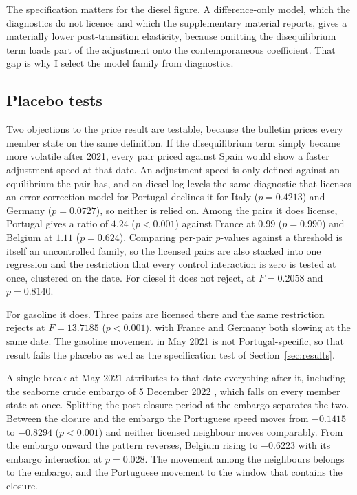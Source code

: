 \documentclass[11pt,a4paper]{article}
\begin{document}
The specification matters for the diesel figure. A difference-only model, which the diagnostics
do not licence and which the supplementary material reports, gives a materially lower post-transition
elasticity, because omitting the disequilibrium term loads part of the adjustment
onto the contemporaneous coefficient. That gap is why I select the model family from
diagnostics.

\subsection{Placebo tests}

Two objections to the price result are testable, because the bulletin prices every member state
on the same definition. If the disequilibrium term simply became more volatile after 2021, every
pair priced against Spain would show a faster adjustment speed at that date. An adjustment
speed is only defined against an equilibrium the pair has, and on diesel log levels the same
diagnostic that licenses an error-correction model for Portugal declines it for Italy
($p=0.4213$) and Germany ($p=0.0727$), so neither is relied on. Among the pairs it does license,
Portugal gives a ratio of $4.24$ ($p<0.001$) against France at $0.99$ ($p=0.990$) and Belgium at
$1.11$ ($p=0.624$). Comparing per-pair $p$-values against a threshold is itself an uncontrolled
family, so the licensed pairs are also stacked into one regression and the restriction that
every control interaction is zero is tested at once, clustered on the date. For diesel it does
not reject, at $F=0.2058$ and $p=0.8140$.

For gasoline it does. Three pairs are licensed there and the same restriction rejects at
$F=13.7185$ ($p<0.001$), with France and Germany both slowing at the same date. The gasoline
movement in May 2021 is not Portugal-specific, so that result fails the placebo as well as the
specification test of Section~\ref{sec:results}.

A single break at May 2021 attributes to that date everything after it, including the seaborne
crude embargo of 5 December 2022 \citep{eu2022embargo}, which falls on every member state at
once. Splitting the post-closure period at the embargo separates the two. Between the closure
and the embargo the Portuguese speed moves from $-0.1415$ to $-0.8294$ ($p<0.001$) and neither
licensed neighbour moves comparably. From the embargo onward the pattern reverses, Belgium
rising to $-0.6223$ with its embargo interaction at $p=0.028$. The movement among the
neighbours belongs to the embargo, and the Portuguese movement to the window that contains the
closure.
\end{document}

